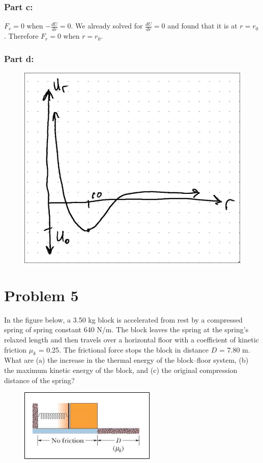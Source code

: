 \documentclass{article}
\begin{document}
\subsubsection*{Part c:}
$F_r = 0$ when $-\frac{dU}{dr} = 0$. We already solved for $\frac{dU}{dr} = 0$ and found that it is at $r = r_0$. Therefore $F_r = 0$ when $r = r_0$.

\subsubsection*{Part d:}
\begin{figure}[ht]
    \centering
    \includegraphics[scale=.20]{graph-2.png}
\end{figure}

\section*{Problem 5}
In the figure below, a 3.50 kg block is accelerated from rest by a compressed spring of spring constant 640
N/m. The block leaves the spring at the spring’s relaxed length and then travels over a horizontal floor with a
coefficient of kinetic friction $\mu_k$ = 0.25. The frictional force stops the block in distance $D$ = 7.80 m. What are
(a) the increase in the thermal energy of the block–floor system, (b) the maximum kinetic energy of the block,
and (c) the original compression distance of the spring?

\begin{figure}[ht]
    \centering
    \includegraphics[scale=.5]{drawing-3.png}
\end{figure}
\end{document}
